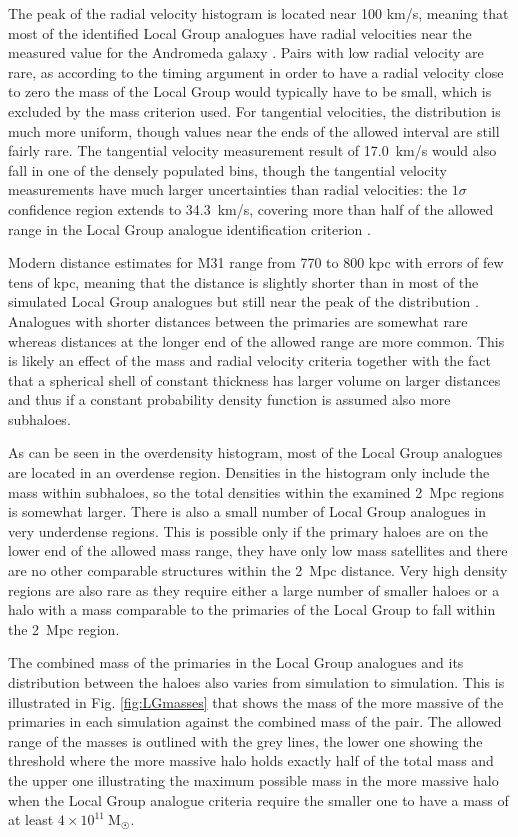 \documentclass[english, oneside]{HYgradu}
\begin{document}
The peak of the radial velocity histogram is located near 100 km/s, meaning that most of the identified Local Group analogues have radial velocities near the measured value for the Andromeda galaxy \citep{vandermarel2012m31}. Pairs with low radial velocity are rare, as according to the timing argument in order to have a radial velocity close to zero the mass of the Local Group would typically have to be small, which is excluded by the mass criterion used. For tangential velocities, the distribution is much more uniform, though values near the ends of the allowed interval are still fairly rare. The \citet{vandermarel2012m31} tangential velocity measurement result of 17.0~km/s would also fall in one of the densely populated bins, though the tangential velocity measurements have much larger uncertainties than radial velocities: the $1\sigma$ confidence region extends to 34.3~km/s, covering more than half of the allowed range in the Local Group analogue identification criterion \citep{vandermarel2012m31}.

Modern distance estimates for M31 range from 770 to 800 kpc with errors of few tens of kpc, meaning that the distance is slightly shorter than in most of the simulated Local Group analogues but still near the peak of the distribution \citep{mcconnachie2005distances}. Analogues with shorter distances between the primaries are somewhat rare whereas distances at the longer end of the allowed range are more common. This is likely an effect of the mass and radial velocity criteria together with the fact that a spherical shell of constant thickness has larger volume on larger distances and thus if a constant probability density function is assumed also more subhaloes.

As can be seen in the overdensity histogram, most of the Local Group analogues are located in an overdense region. Densities in the histogram only include the mass within subhaloes, so the total densities within the examined 2~Mpc regions is somewhat larger. There is also a small number of Local Group analogues in very underdense regions. This is possible only if the primary haloes are on the lower end of the allowed mass range, they have only low mass satellites and there are no other comparable structures within the 2~Mpc distance. Very high density regions are also rare as they require either a large number of smaller haloes or a halo with a mass comparable to the primaries of the Local Group to fall within the 2~Mpc region.

The combined mass of the primaries in the Local Group analogues and its distribution between the haloes also varies from simulation to simulation. This is illustrated in Fig. \ref{fig:LGmasses} that shows the mass of the more massive of the primaries in each simulation against the combined mass of the pair. The allowed range of the masses is outlined with the grey lines, the lower one showing the threshold where the more massive halo holds exactly half of the total mass and the upper one illustrating the maximum possible mass in the more massive halo when the Local Group analogue criteria require the smaller one to have a mass of at least $4 \times 10^{11}~\mathrm{M_{\astrosun}}$.
\end{document}
